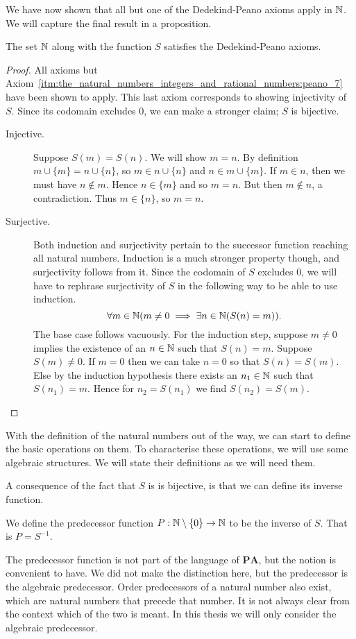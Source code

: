 \documentclass[../main.tex]{subfiles}
\begin{document}
We have now shown that all but one of the Dedekind-Peano axioms apply in $\mathbb{N}$. We will capture the final result in a proposition.
\begin{proposition}
    The set $\mathbb{N}$ along with the function $S$ satisfies the Dedekind-Peano axioms.
\end{proposition}
\begin{proof}
    All axioms but Axiom~\ref{itm:the_natural_numbers_integers_and_rational_numbers:peano_7} have been shown to apply. This last axiom corresponds to showing injectivity of $S$. Since its codomain excludes $0$, we can make a stronger claim; $S$ is bijective.
    \begin{description}
        \item[Injective.] Suppose $S(m)=S(n)$. We will show $m=n$. By definition $m\cup\{m\}=n\cup\{n\}$, so $m\in n\cup\{n\}$ and $n\in m\cup\{m\}$. If $m\in n$, then we must have $n\notin m$. Hence $n\in\{m\}$ and so $m=n$. But then $m\notin n$, a contradiction. Thus $m\in\{n\}$, so $m=n$.
        \item[Surjective.] Both induction and surjectivity pertain to the successor function reaching all natural numbers. Induction is a much stronger property though, and surjectivity follows from it. Since the codomain of $S$ excludes $0$, we will have to rephrase surjectivity of $S$ in the following way to be able to use induction.
        \begin{equation*}
            \forall m\in\mathbb{N}(m\neq0\implies\exists n\in\mathbb{N}(S(n)=m)).
        \end{equation*}
        The base case follows vacuously. For the induction step, suppose $m\neq0$ implies the existence of an $n\in\mathbb{N}$ such that $S(n)=m$. Suppose $S(m)\neq0$. If $m=0$ then we can take $n=0$ so that $S(n)=S(m)$. Else by the induction hypothesis there exists an $n_1\in\mathbb{N}$ such that $S(n_1)=m$. Hence for $n_2=S(n_1)$ we find $S(n_2)=S(m)$.
    \end{description}
\end{proof}

With the definition of the natural numbers out of the way, we can start to define the basic operations on them. To characterise these operations, we will use some algebraic structures. We will state their definitions as we will need them.

A consequence of the fact that $S$ is is bijective, is that we can define its inverse function.
\begin{definition}\label{dfn:the_natural_numbers_integers_and_rational_numbers:predecessor_function}
    We define the predecessor function $P:\mathbb{N}\setminus\{0\}\to\mathbb{N}$ to be the inverse of $S$. That is $P=S^{-1}$.
\end{definition}
The predecessor function is not part of the language of $\mathbf{PA}$, but the notion is convenient to have. We did not make the distinction here, but the predecessor is the algebraic predecessor. Order predecessors of a natural number also exist, which are natural numbers that precede that number. It is not always clear from the context which of the two is meant. In this thesis we will only consider the algebraic predecessor.
\end{document}
